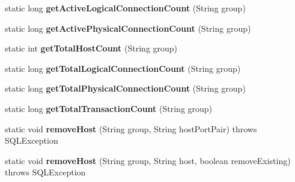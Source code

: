 \begin{DoxyCompactItemize}
\mbox{\label{classcom_1_1mysql_1_1jdbc_1_1_connection_group_manager_ab801351fde9a14d492f3d4f20e9304f4}} 
static long {\bfseries get\+Active\+Logical\+Connection\+Count} (String group)
\item 
\mbox{\label{classcom_1_1mysql_1_1jdbc_1_1_connection_group_manager_a11d0378b1174cdfadaf9ffa78823d8ee}} 
static long {\bfseries get\+Active\+Physical\+Connection\+Count} (String group)
\item 
\mbox{\label{classcom_1_1mysql_1_1jdbc_1_1_connection_group_manager_a59a854d3dfce3967a4b8ed2497545631}} 
static int {\bfseries get\+Total\+Host\+Count} (String group)
\item 
\mbox{\label{classcom_1_1mysql_1_1jdbc_1_1_connection_group_manager_a5fdbb71ff4383d2c0b2b5e9e91143342}} 
static long {\bfseries get\+Total\+Logical\+Connection\+Count} (String group)
\item 
\mbox{\label{classcom_1_1mysql_1_1jdbc_1_1_connection_group_manager_ab6b5577b9e89fd0c0182f238cebb7fdc}} 
static long {\bfseries get\+Total\+Physical\+Connection\+Count} (String group)
\item 
\mbox{\label{classcom_1_1mysql_1_1jdbc_1_1_connection_group_manager_a856652b185f61c4895364c9a53c147ce}} 
static long {\bfseries get\+Total\+Transaction\+Count} (String group)
\item 
\mbox{\label{classcom_1_1mysql_1_1jdbc_1_1_connection_group_manager_a52c456a17c92e7a134253eded52dc5bd}} 
static void {\bfseries remove\+Host} (String group, String host\+Port\+Pair)  throws S\+Q\+L\+Exception 
\item 
\mbox{\label{classcom_1_1mysql_1_1jdbc_1_1_connection_group_manager_a018d1f177f2d102988b653d0c186bafd}} 
static void {\bfseries remove\+Host} (String group, String host, boolean remove\+Existing)  throws S\+Q\+L\+Exception 

\end{DoxyCompactItemize}

